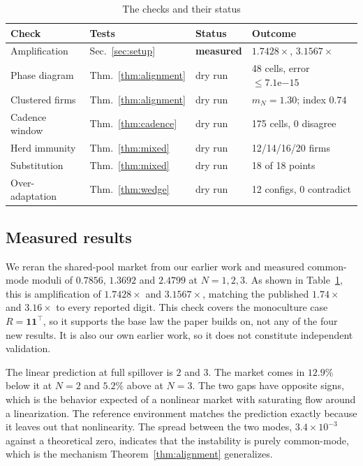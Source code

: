 \documentclass[conference]{IEEEtran}
\theoremstyle{plain}
\newcommand{\mN}{m_N}
\newcommand{\one}{\mathbf{1}}
\begin{document}
\begin{table}[!t]
\centering
\caption{The checks and their status}
\label{tab:panels}
\small
\setlength{\tabcolsep}{3.5pt}
\begin{tabular}{@{}llll@{}}
\toprule
Check & Tests & Status & Outcome \\
\midrule
Amplification & Sec.~\ref{sec:setup} & \textbf{measured} & $1.7428\times$, $3.1567\times$ \\
Phase diagram & Thm.~\ref{thm:alignment} & dry run & 48 cells, error $\le7.1\mathrm{e}{-15}$ \\
Clustered firms & Thm.~\ref{thm:alignment} & dry run & $\mN=1.30$; index $0.74$ \\
Cadence window & Thm.~\ref{thm:cadence} & dry run & 175 cells, 0 disagree \\
Herd immunity & Thm.~\ref{thm:mixed} & dry run & 12/14/16/20 firms \\
Substitution & Thm.~\ref{thm:mixed} & dry run & 18 of 18 points \\
Over-adaptation & Thm.~\ref{thm:wedge} & dry run & 12 configs, 0 contradict \\
\bottomrule
\end{tabular}
\end{table}

\subsection{Measured results}
We reran the shared-pool market from our earlier work \cite{reflex2026} and measured common-mode moduli of $0.7856$, $1.3692$ and $2.4799$ at $N=1,2,3$. As shown in Table~\ref{tab:panels}, this is amplification of $1.7428\times$ and $3.1567\times$, matching the published $1.74\times$ and $3.16\times$ to every reported digit. This check covers the monoculture case $R=\one\one^{\top}$, so it supports the base law the paper builds on, not any of the four new results. It is also our own earlier work, so it does not constitute independent validation.

The linear prediction at full spillover is $2$ and $3$. The market comes in $12.9\%$ below it at $N=2$ and $5.2\%$ above at $N=3$. The two gaps have opposite signs, which is the behavior expected of a nonlinear market with saturating flow around a linearization. The reference environment matches the prediction exactly because it leaves out that nonlinearity. The spread between the two modes, $3.4\times10^{-3}$ against a theoretical zero, indicates that the instability is purely common-mode, which is the mechanism Theorem~\ref{thm:alignment} generalizes.
\end{document}
